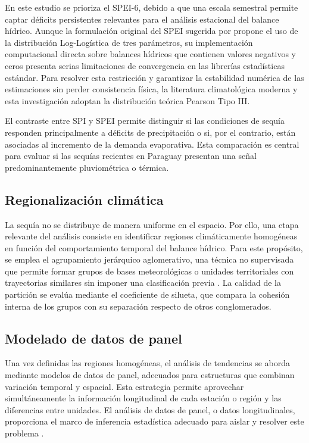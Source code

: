 \documentclass[11pt,a4paper]{article}
\begin{document}
En este estudio se prioriza el SPEI-6, debido a que una escala semestral permite captar déficits persistentes relevantes para el análisis estacional del balance hídrico. Aunque la formulación original del SPEI sugerida por \citet{vicenteserrano2010} propone el uso de la distribución Log-Logística de tres parámetros, su implementación computacional directa sobre balances hídricos que contienen valores negativos y ceros presenta serias limitaciones de convergencia en las librerías estadísticas estándar. Para resolver esta restricción y garantizar la estabilidad numérica de las estimaciones sin perder consistencia física, la literatura climatológica moderna y esta investigación adoptan la distribución teórica Pearson Tipo III.

El contraste entre SPI y SPEI permite distinguir si las condiciones de sequía responden principalmente a déficits de precipitación o si, por el contrario, están asociadas al incremento de la demanda evaporativa. Esta comparación es central para evaluar si las sequías recientes en Paraguay presentan una señal predominantemente pluviométrica o térmica.

\subsection{Regionalización climática}

La sequía no se distribuye de manera uniforme en el espacio. Por ello, una etapa relevante del análisis consiste en identificar regiones climáticamente homogéneas en función del comportamiento temporal del balance hídrico. Para este propósito, se emplea el agrupamiento jerárquico aglomerativo, una técnica no supervisada que permite formar grupos de bases meteorológicas o unidades territoriales con trayectorias similares sin imponer una clasificación previa \citep{atlas1992,gong1995}. La calidad de la partición se evalúa mediante el coeficiente de silueta, que compara la cohesión interna de los grupos con su separación respecto de otros conglomerados.

\subsection{Modelado de datos de panel}

Una vez definidas las regiones homogéneas, el análisis de tendencias se aborda mediante modelos de datos de panel, adecuados para estructuras que combinan variación temporal y espacial. Esta estrategia permite aprovechar simultáneamente la información longitudinal de cada estación o región y las diferencias entre unidades. El análisis de datos de panel, o datos longitudinales, proporciona el marco de inferencia estadística adecuado para aislar y resolver este problema \citep{wooldridge2010}. 
\end{document}
